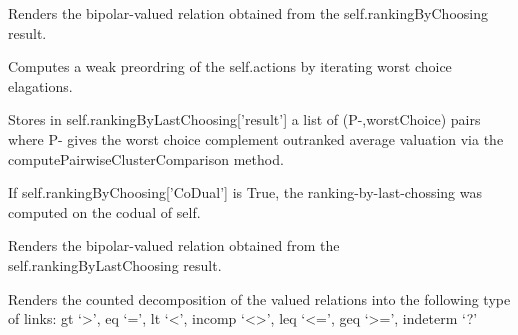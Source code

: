 \documentclass[letterpaper,10pt,english]{sphinxmanual}
\begin{document}
\begin{fulllineitems}

\begin{fulllineitems}
\label{techDoc:digraphs.Digraph.computeRankingByChoosingRelation}
Renders the bipolar-valued relation obtained from
the self.rankingByChoosing result.

\end{fulllineitems}


\begin{fulllineitems}
\label{techDoc:digraphs.Digraph.computeRankingByLastChoosing}
Computes a weak preordring of the self.actions by iterating
worst choice elagations.

Stores in self.rankingByLastChoosing{[}'result'{]} a list of (P-,worstChoice) pairs
where P- gives the worst choice complement outranked
average valuation via the computePairwiseClusterComparison
method.

If self.rankingByChoosing{[}'CoDual'{]} is True, the ranking-by-last-chossing 
was computed on the codual of self.

\end{fulllineitems}


\begin{fulllineitems}
\label{techDoc:digraphs.Digraph.computeRankingByLastChoosingRelation}
Renders the bipolar-valued relation obtained from
the self.rankingByLastChoosing result.

\end{fulllineitems}


\begin{fulllineitems}
\label{techDoc:digraphs.Digraph.computeRelationalStructure}
Renders the counted decomposition of the valued relations into
the following type of links:
gt `\textgreater{}', eq `=', lt `\textless{}', incomp `\textless{}\textgreater{}',
leq `\textless{}=', geq `\textgreater{}=', indeterm `?'


\end{fulllineitems}
\end{fulllineitems}
\end{document}
